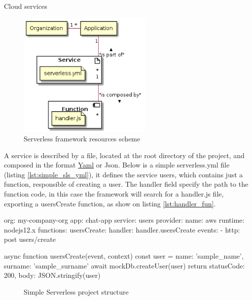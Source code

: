 \begin{chapter}{Cloud services}
    \begin{figure}
        \centering
        \includegraphics[width=6.5cm]{source/diagrams/serverless_app_service.png}
        \caption{Serverless framework resources scheme}
        \label{fig:sls_resource_scheme}
    \end{figure}

    A service is described by a file, located at the root directory of the project,
    and composed in the format \href{https://yaml.org/}{Yaml} or Json.
    Below is a simple serverless.yml file (listing \ref{lst:simple_sls_yml}), it
    defines the service users, which contains just a function, responsible of creating
    a user. The handler field specify the path to the function code, in this case
    the framework will search for a handler.js file, exporting a usersCreate function,
    as show on listing \ref{lst:handler_fun}.

    \bigskip
    \begin{code}[caption=Simple serverless.yml file, label={lst:simple_sls_yml}]
org: my-company-org
app: chat-app
service: users
provider:
  name: aws
  runtime: nodejs12.x
functions:
  usersCreate:
    handler: handler.usersCreate
    events:
      - http: post users/create
    \end{code}

    \begin{code}[caption=Simple handler function, label={lst:handler_fun}]
async function usersCreate(event, context) {
  const user = {
    name: 'sample_name',
    surname: 'sample_surname'
  }
  await mockDb.createUser(user)
  return {
    statusCode: 200,
    body: JSON.stringify({user})
  }
}
    \end{code}

    \begin{figure}
        \begin{minipage}{\linewidth}
        \end{minipage}
        \caption{Simple Serverless project structure}
        \label{fig:sls_project_structure}
    \end{figure}


\end{chapter}
